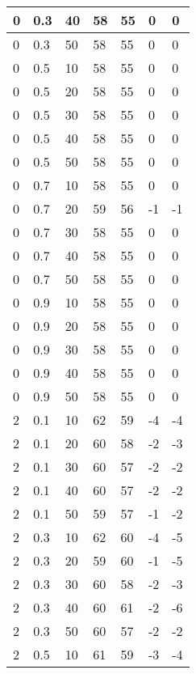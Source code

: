 \begin{longtable}{|l|l|l|l|l|l|l|}
		0     & 0.3 & 40   & 58 & 55 & 0   & 0   \\ \hline
		0     & 0.3 & 50   & 58 & 55 & 0   & 0   \\ \hline
		0     & 0.5 & 10   & 58 & 55 & 0   & 0   \\ \hline
		0     & 0.5 & 20   & 58 & 55 & 0   & 0   \\ \hline
		0     & 0.5 & 30   & 58 & 55 & 0   & 0   \\ \hline
		0     & 0.5 & 40   & 58 & 55 & 0   & 0   \\ \hline
		0     & 0.5 & 50   & 58 & 55 & 0   & 0   \\ \hline
		0     & 0.7 & 10   & 58 & 55 & 0   & 0   \\ \hline
		0     & 0.7 & 20   & 59 & 56 & -1  & -1  \\ \hline
		0     & 0.7 & 30   & 58 & 55 & 0   & 0   \\ \hline
		0     & 0.7 & 40   & 58 & 55 & 0   & 0   \\ \hline
		0     & 0.7 & 50   & 58 & 55 & 0   & 0   \\ \hline
		0     & 0.9 & 10   & 58 & 55 & 0   & 0   \\ \hline
		0     & 0.9 & 20   & 58 & 55 & 0   & 0   \\ \hline
		0     & 0.9 & 30   & 58 & 55 & 0   & 0   \\ \hline
		0     & 0.9 & 40   & 58 & 55 & 0   & 0   \\ \hline
		0     & 0.9 & 50   & 58 & 55 & 0   & 0   \\ \hline
		2     & 0.1 & 10   & 62 & 59 & -4  & -4  \\ \hline
		2     & 0.1 & 20   & 60 & 58 & -2  & -3  \\ \hline
		2     & 0.1 & 30   & 60 & 57 & -2  & -2  \\ \hline
		2     & 0.1 & 40   & 60 & 57 & -2  & -2  \\ \hline
		2     & 0.1 & 50   & 59 & 57 & -1  & -2  \\ \hline
		2     & 0.3 & 10   & 62 & 60 & -4  & -5  \\ \hline
		2     & 0.3 & 20   & 59 & 60 & -1  & -5  \\ \hline
		2     & 0.3 & 30   & 60 & 58 & -2  & -3  \\ \hline
		2     & 0.3 & 40   & 60 & 61 & -2  & -6  \\ \hline
		2     & 0.3 & 50   & 60 & 57 & -2  & -2  \\ \hline
		2     & 0.5 & 10   & 61 & 59 & -3  & -4  \\ \hline

\end{longtable}

